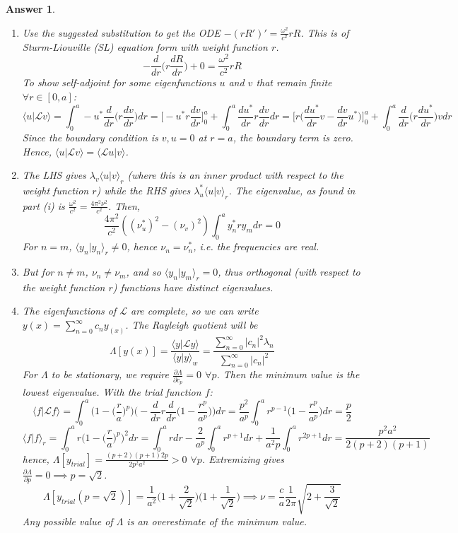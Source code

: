 \documentclass[a4paper]{article}
\newtheorem{ans}{Answer}[section]
\theoremstyle{new}
\begin{document}
\begin{ans}\leavevmode
\begin{enumerate}[label=(\roman*)]
\item Use the suggested substitution to get the ODE $-(rR')'=\frac{\omega^2}{c^2}rR$. This is of Sturm-Liouville (SL) equation form with weight function $r$. 
$$-\frac{d}{dr}\bigg(r\frac{dR}{dr}\bigg)+0=\frac{\omega^2}{c^2}rR$$
To show self-adjoint for some eigenfunctions $u$ and $v$ that remain finite $\forall r\in[0,a]$:
$$\langle u|\mathcal{L}v\rangle=\int_0^a-u^*\frac{d}{dr}\bigg(r\frac{dv}{dr}\bigg)dr=\bigg[-u^*r\frac{dv}{dr}\bigg]_0^a+\int_0^a\frac{du^*}{dr}r\frac{dv}{dr}dr=\bigg[r\bigg(\frac{du^*}{dr}v-\frac{dv}{dr}u^*\bigg)\bigg]_0^a+\int_0^a\frac{d}{dr}\bigg(r\frac{du^*}{dr}\bigg)vdr$$
Since the boundary condition is $v,u=0$ at $r=a$, the boundary term is zero. Hence, $\langle u|\mathcal{L}v\rangle=\langle\mathcal{L}u|v\rangle$.
\item The LHS gives $\lambda_v\langle u|v\rangle_r$ (where this is an inner product with respect to the weight function $r$) while the RHS gives $\lambda_u^*\langle u|v\rangle_r$. The eigenvalue, as found in part (i) is $\frac{\omega^2}{c^2}=\frac{4\pi^2\nu^2}{c^2}$. Then,
$$\frac{4\pi^2}{c^2}((\nu_u^*)^2-(\nu_v)^2)\int_0^ay_n^*ry_mdr=0$$
For $n=m$, $\langle y_n|y_n\rangle_r\neq 0$, hence $\nu_n=\nu_n^*$, i.e. the frequencies are real. 
\item But for $n\neq m$, $\nu_n\neq\nu_m$, and so $\langle y_n|y_m\rangle_r=0$, thus orthogonal (with respect to the weight function $r$) functions have distinct eigenvalues.
\item The eigenfunctions of $\mathcal{L}$ are complete, so we can write $y(x)=\sum_{n=0}^\infty c_ny_(x)$. The Rayleigh quotient will be
$$\Lambda[y(x)]=\frac{\langle y|\mathcal{L}y\rangle}{\langle y|y\rangle_w}=\frac{\sum_{n=0}^\infty|c_n|^2\lambda_n}{\sum_{n=0}^\infty |c_n|^2}$$
For $\Lambda$ to be stationary, we require $\frac{\partial\Lambda}{\partial c_p}=0$ $\forall p$. Then the minimum value is the lowest eigenvalue. With the trial function $f$:
$$\langle f|\mathcal{L}f\rangle=\int_0^a\bigg(1-\bigg(\frac{r}{a}\bigg)^p\bigg)\bigg(-\frac{d}{dr}r\frac{d}{dr}\bigg(1-\frac{r^p}{a^p}\bigg)\bigg)dr=\frac{p^2}{a^p}\int_0^ar^{p-1}\bigg(1-\frac{r^p}{a^p}\bigg)dr=\frac{p}{2}$$
$$\langle f|f\rangle_r=\int_0^ar\bigg(1-\bigg(\frac{r}{a}\bigg)^p\bigg)^2dr=\int_0^ardr-\frac{2}{a^p}\int_0^ar^{p+1}dr+\frac{1}{a^2p}\int_0^ar^{2p+1}dr=\frac{p^2a^2}{2(p+2)(p+1)}$$
hence, $\Lambda[y_{trial}]=\frac{(p+2)(p+1)2p}{2p^2a^2}>0$ $\forall p$. Extremizing gives $\frac{\partial\Lambda}{\partial p}=0\implies p=\sqrt{2}$.
$$\Lambda[y_{trial}(p=\sqrt{2})]=\frac{1}{a^2}\bigg(1+\frac{2}{\sqrt{2}}\bigg)\bigg(1+\frac{1}{\sqrt{2}}\bigg)\implies\nu=\frac{c}{a}\frac{1}{2\pi}\sqrt{2+\frac{3}{\sqrt{2}}}$$
Any possible value of $\Lambda$ is an overestimate of the minimum value.
\end{enumerate}
\end{ans}
\newpage
\end{document}
